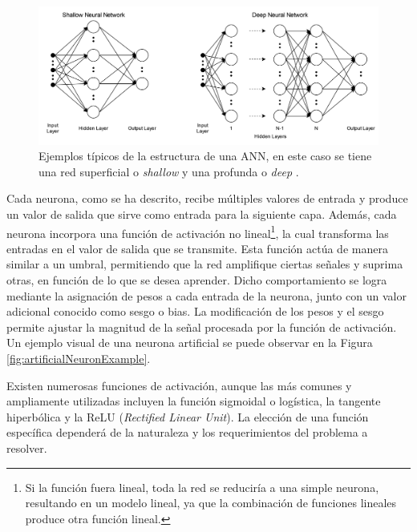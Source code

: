 \begin{figure}[h]
    \centering
    \includegraphics[width=\linewidth]{figures/2_theory/neuralNetDiagram.png}
    \caption[Ejemplos de la estructura de una ANN]{Ejemplos típicos de la estructura de una ANN, en este caso se tiene una red superficial o \textit{shallow} y una profunda o \textit{deep} \cite{annPictureSource}.}
    \label{fig:annExample}
\end{figure}

Cada neurona, como se ha descrito, recibe múltiples valores de entrada y produce un valor de salida que sirve como entrada para la siguiente capa. Además, cada neurona incorpora una función de activación no lineal\footnote{Si la función fuera lineal, toda la red se reduciría a una simple neurona, resultando en un modelo lineal, ya que la combinación de funciones lineales produce otra función lineal.}, la cual transforma las entradas en el valor de salida que se transmite. Esta función actúa de manera similar a un umbral, permitiendo que la red amplifique ciertas señales y suprima otras, en función de lo que se desea aprender. Dicho comportamiento se logra mediante la asignación de pesos a cada entrada de la neurona, junto con un valor adicional conocido como sesgo o bias. La modificación de los pesos y el sesgo permite ajustar la magnitud de la señal procesada por la función de activación. Un ejemplo visual de una neurona artificial se puede observar en la Figura \ref{fig:artificialNeuronExample}.

Existen numerosas funciones de activación, aunque las más comunes y ampliamente utilizadas incluyen la función sigmoidal o logística, la tangente hiperbólica y la ReLU (\textit{Rectified Linear Unit}). La elección de una función específica dependerá de la naturaleza y los requerimientos del problema a resolver.

